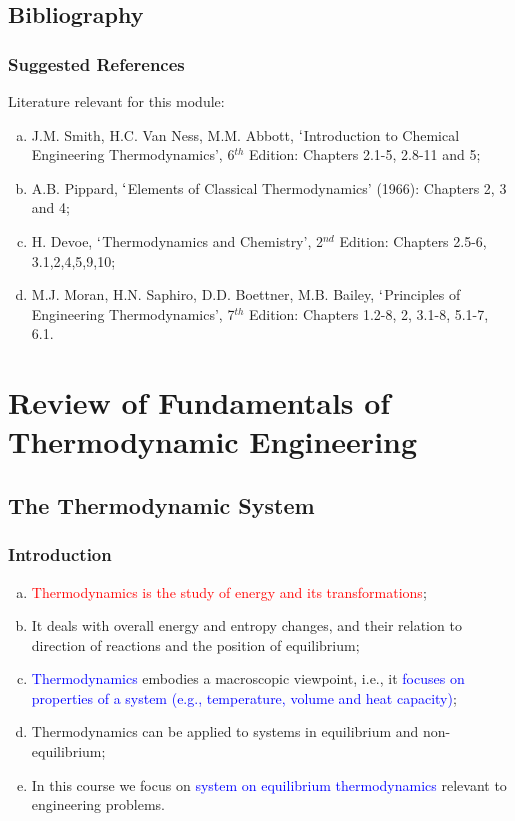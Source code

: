\documentclass[10pt,compress,handout,ignorenonframetext]{beamer}
\newcommand{\red}{\textcolor{red}}
\newcommand{\blue}{\textcolor{blue}}
\begin{document}
 \subsection{Bibliography} 
   \begin{frame}
     \frametitle{Suggested References}
       Literature relevant for this module:
     \begin{enumerate}[(a)]
       \item J.M. Smith, H.C. Van Ness, M.M. Abbott, $\lq$Introduction to Chemical Engineering Thermodynamics', 6$^{th}$ Edition: Chapters 2.1-5, 2.8-11 and 5;
       \item A.B. Pippard, $\lq$Elements of Classical Thermodynamics' (1966): Chapters 2, 3 and 4;
       \item H. Devoe, $\lq$Thermodynamics and Chemistry', 2$^{nd}$ Edition: Chapters 2.5-6, 3.1,2,4,5,9,10;
       \item M.J. Moran, H.N. Saphiro, D.D. Boettner, M.B. Bailey, $\lq$Principles of Engineering Thermodynamics', 7$^{th}$ Edition: Chapters 1.2-8, 2, 3.1-8, 5.1-7, 6.1.
     \end{enumerate}
\end{frame}


 \section{Review of Fundamentals of Thermodynamic Engineering}

\subsection{The Thermodynamic System}
\begin{frame}
 \frametitle{Introduction}
  \begin{enumerate}[(a)]
   \item <1-> \red{Thermodynamics is the study of energy and its transformations};
   \item <2-> It deals with overall energy and entropy changes, and their relation to direction of reactions and the position of equilibrium;
   \item <3-> \blue{Thermodynamics} embodies a macroscopic viewpoint, i.e., it \blue{focuses on properties of a system (e.g., temperature, volume and heat capacity)};
   \item <4-> Thermodynamics can be applied to systems in equilibrium and non-equilibrium;
   \item <5-> In this course we focus on \blue{system on equilibrium thermodynamics} relevant to engineering problems.     
  \end{enumerate}
\end{frame}
\end{document}
